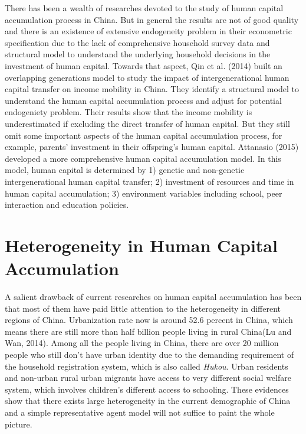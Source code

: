 \documentclass[12pt]{article}%
\theoremstyle{definition}
\numberwithin{equation}{section}
\begin{document}
There has been a wealth of researches devoted to the study of human capital accumulation process in China. But in general the results are not of good quality and there is an existence of extensive endogeneity problem in their econometric specification due to the lack of comprehensive household survey data  and structural model to understand the underlying household decisions in the investment of human capital. Towards that aspect, Qin et al. (2014) built an overlapping generations model to study the impact of intergenerational human capital transfer on income mobility in China. They identify a structural model to understand the human capital accumulation process and adjust for potential endogeniety problem. Their results show that the income mobility is underestimated if excluding the direct transfer of human capital. But they still omit some important aspects of the human capital accumulation process, for example, parents’ investment in their offspring’s human capital. Attanasio (2015) developed a more comprehensive human capital accumulation model. In this model, human capital is determined by 1) genetic and non-genetic intergenerational human capital transfer; 2) investment of resources and time in human capital accumulation; 3) environment variables including school, peer interaction and education policies. \par

\section{Heterogeneity in Human Capital Accumulation}
A salient drawback of current researches on human capital accumulation has been that most of them have paid little attention to the heterogeneity in different regions of China. Urbanization rate now is around 52.6 percent in China, which means there are still more than half billion people living in rural China(Lu and Wan, 2014). Among all the people living in China, there are over 20 million people who still don't have urban identity due to the demanding requirement of the household registration system, which is also called \textit{Hukou}. Urban residents and non-urban rural urban migrants have access to very different social welfare system, which involves children's different access to schooling. These evidences show that there exists large heterogeneity in the current demographic of China and a simple representative agent model will not suffice to paint the whole picture.\par
\end{document}
